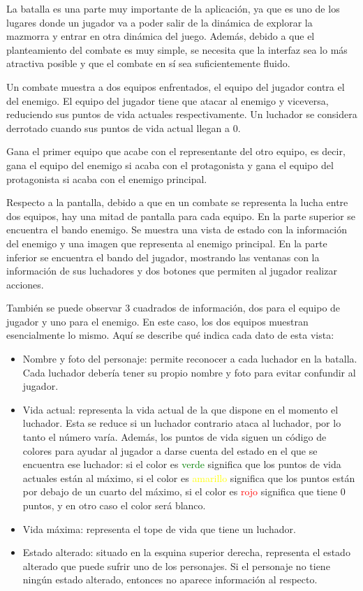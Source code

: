 La batalla es una parte muy importante de la aplicación, ya que es uno de los lugares donde un jugador va a poder salir de la dinámica de explorar la mazmorra y entrar en otra dinámica del juego.
Además, debido a que el planteamiento del combate es muy simple, se necesita que la interfaz sea lo más atractiva posible y que el combate en sí sea suficientemente fluido.

Un combate muestra a dos equipos enfrentados, el equipo del jugador contra el del enemigo. El equipo del jugador tiene que atacar al enemigo y viceversa, reduciendo sus puntos de vida actuales respectivamente. Un luchador se considera derrotado cuando sus puntos de vida actual llegan a 0.

Gana el primer equipo que acabe con el representante del otro equipo, es decir, gana el equipo del enemigo si acaba con el protagonista y gana el equipo del protagonista si acaba con el enemigo principal.

Respecto a la pantalla, debido a que en un combate se representa la lucha entre dos equipos, hay una mitad de pantalla para cada equipo.
En la parte superior se encuentra el bando enemigo. Se muestra una vista de estado con la información del enemigo y una imagen que representa al enemigo principal.
En la parte inferior se encuentra el bando del jugador, mostrando las ventanas con la información de sus luchadores y dos botones que permiten al jugador realizar acciones.

También se puede observar 3 cuadrados de información, dos para el equipo de jugador y uno para el enemigo. En este caso, los dos equipos muestran esencialmente lo mismo. Aquí se describe qué indica cada dato de esta vista:
\begin{itemize}
	\item Nombre y foto del personaje: permite reconocer a cada luchador en la batalla. Cada luchador debería tener su propio nombre y foto para evitar confundir al jugador.
	\item Vida actual: representa la vida actual de la que dispone en el momento el luchador. Esta se reduce si un luchador contrario ataca al luchador, por lo tanto el número varía.
	Además, los puntos de vida siguen un código de colores para ayudar al jugador a darse cuenta del estado en el que se encuentra ese luchador: si el color es \textcolor{green}{verde} significa que los puntos de vida actuales están al máximo, si el color es \textcolor{yellow}{amarillo} significa que los puntos están por debajo de un cuarto del máximo, si el color es  \textcolor{red}{rojo} significa que tiene 0 puntos, y en otro caso el color será blanco.
	\item Vida máxima: representa el tope de vida que tiene un luchador.
	\item Estado alterado: situado en la esquina superior derecha, representa el estado alterado que puede sufrir uno de los personajes. Si el personaje no tiene ningún estado alterado, entonces no aparece información al respecto.
\end{itemize}

